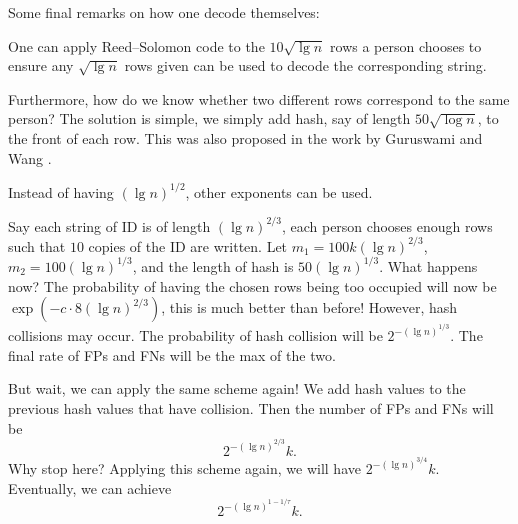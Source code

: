 Some final remarks on how one decode themselves: 
\begin{remark}
    One can apply Reed--Solomon code to the $10\sqrt{\lg n}$ rows a person chooses to ensure any $\sqrt{\lg n}$ rows given can be used to decode the corresponding string.

    Furthermore, how do we know whether two different rows correspond to the same person? The solution is simple, we simply add hash, say of length $50\sqrt{\log n}$, to the front of each row. This was also proposed in the work by Guruswami and Wang \cite{exponent_optimal_GT}.
\end{remark}

\begin{remark}
    Instead of having $(\lg n)^{1/2}$, other exponents can be used.

    Say each string of ID is of length $(\lg n)^{2/3}$, each person chooses enough rows such that $10$ copies of the ID are written. Let $m_1 = 100k(\lg n)^{2/3}$, $m_2 = 100(\lg n)^{1/3}$, and the length of hash is $50(\lg n)^{1/3}$. What happens now? The probability of having the chosen rows being too occupied will now be $\exp(-c\cdot 8(\lg n)^{2/3})$, this is much better than before! However, hash collisions may occur. The probability of hash collision will be $2^{-(\lg n)^{1/3}}$. The final rate of FPs and FNs will be the max of the two.

    But wait, we can apply the same scheme again! We add hash values to the previous hash values that have collision. Then the number of FPs and FNs will be
    \begin{equation*}
        2^{-(\lg n)^{2/3}}k.
    \end{equation*}
    Why stop here? Applying this scheme again, we will have $2^{-(\lg n)^{3/4}}k$. Eventually, we can achieve
    \begin{equation}
        2^{-(\lg n)^{1-1/\tau}} k.
    \end{equation}
\end{remark}
















